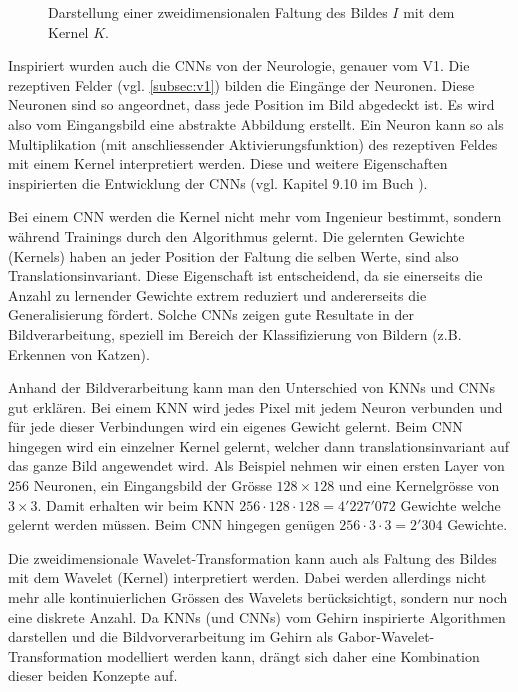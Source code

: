 \begin{figure}
	\centering
	
	\caption{Darstellung einer zweidimensionalen Faltung des Bildes $I$ mit dem Kernel $K$.}
	\label{fig:2dconv}
\end{figure}

Inspiriert wurden auch die CNNs von der Neurologie, genauer vom V1.
Die rezeptiven Felder (vgl. \ref{subsec:v1}) bilden die Eingänge der Neuronen.
Diese Neuronen sind so angeordnet, dass jede Position im Bild abgedeckt ist.
Es wird also vom Eingangsbild eine abstrakte Abbildung erstellt.
Ein Neuron kann so als Multiplikation (mit anschliessender Aktivierungsfunktion) des rezeptiven Feldes mit einem Kernel interpretiert werden.
Diese und weitere Eigenschaften inspirierten die Entwicklung der CNNs (vgl. Kapitel 9.10 im Buch \cite{book:deeplearning}).

Bei einem CNN werden die Kernel nicht mehr vom Ingenieur bestimmt, sondern während Trainings durch den Algorithmus gelernt.  
Die gelernten Gewichte (Kernels) haben an jeder Position der Faltung die selben Werte, sind also Translationsinvariant.
Diese Eigenschaft ist entscheidend, da sie einerseits die Anzahl zu lernender Gewichte extrem reduziert und andererseits die Generalisierung fördert.
Solche CNNs zeigen gute Resultate in der Bildverarbeitung, speziell im Bereich der Klassifizierung von Bildern (z.B. Erkennen von Katzen).

Anhand der Bildverarbeitung kann man den Unterschied von KNNs und CNNs gut erklären.
Bei einem KNN wird jedes Pixel mit jedem Neuron verbunden und für jede dieser Verbindungen wird ein eigenes Gewicht gelernt.
Beim CNN hingegen wird ein einzelner Kernel gelernt, welcher dann translationsinvariant auf das ganze Bild angewendet wird.
Als Beispiel nehmen wir einen ersten Layer von $256$ Neuronen, ein Eingangsbild der Grösse $128\times128$ und eine Kernelgrösse von $3\times3$.
Damit erhalten wir beim KNN	$256 \cdot 128 \cdot 128 = 4'227'072$ Gewichte welche gelernt werden müssen.
Beim CNN hingegen genügen $256 \cdot 3 \cdot 3 = 2'304$ Gewichte.

Die zweidimensionale Wavelet-Transformation kann auch als Faltung des Bildes mit dem Wavelet (Kernel) interpretiert werden.
Dabei werden allerdings nicht mehr alle kontinuierlichen Grössen des Wavelets berücksichtigt, sondern nur noch eine diskrete Anzahl.
Da KNNs (und CNNs) vom Gehirn inspirierte Algorithmen darstellen und die Bildvorverarbeitung im Gehirn als Gabor-Wavelet-Transformation modelliert werden kann, drängt sich daher eine Kombination dieser beiden Konzepte auf.

